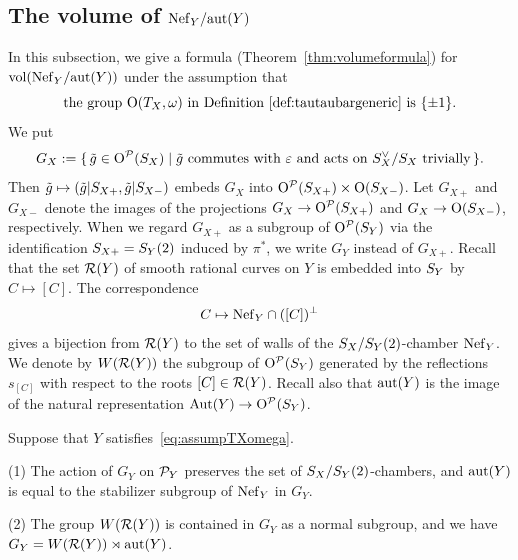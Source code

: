\documentclass{amsart}
\numberwithin{procedure}{section}
\begin{document}
\subsection{The volume of $\mathord{\rm Nef}_{Y}/\mathord{\rm{aut}}(Y)$}\label{subsec:vol}
%
In this subsection,
we give a  formula (Theorem~\ref{thm:volumeformula}) 
for $\mathord{\rm{vol}}(\mathord{\rm Nef}_{Y}/\mathord{\rm{aut}}(Y))$
under the assumption that 
%
\begin{equation}\label{eq:assumpTXomega}
\textrm{the group $\mathord{\mathrm{O}}(T_X, \omega)$  in Definition~\ref{def:tautaubargeneric} is $\{\pm 1\}$.}
\end{equation}
We put 
%
\begin{equation}\label{eq:GX}
G_X:=\{\,{\tilde{g} \in \mathord{\mathrm{O}}^{\mathord{\mathcal P}}(S_{X})}\mid {\textrm{$\tilde{g}$ commutes with $\varepsilon$ and acts on $S_{X}\sp{\vee}/S_{X}$ trivially}} \,\}.
\end{equation}
%
Then $\tilde{g}\mapsto (\tilde{g} | S_{X+}, \tilde{g} | S_{X-})$ embeds $G_X$ into  $\mathord{\mathrm{O}}^{\mathord{\mathcal P}}(S_{X+})\times \mathord{\mathrm{O}}(S_{X-})$.
Let $G_{X+}$ and $G_{X-}$ denote the images  of
the projections $G_X\to \mathord{\mathrm{O}}^{\mathord{\mathcal P}}(S_{X+})$ and $G_X\to \mathord{\mathrm{O}}(S_{X-})$,
respectively.
When we regard $G_{X+}$ as a subgroup of $\mathord{\mathrm{O}}^{\mathord{\mathcal P}}(S_{Y})$ via
the identification $S_{X+}=S_{Y}(2)$ induced by $\pi^*$, we write  $G_Y$ instead of $G_{X+}$.
%
%
Recall that the set $\mathord{\mathcal R}(Y)$ of smooth rational curves on $Y$
is embedded into $S_{Y}$ by $C\mapsto [C]$.
The correspondence
\[
C \mapsto \mathord{\rm Nef}_{Y}\cap ([C])\sp{\perp}
\]
gives a bijection from $\mathord{\mathcal R}(Y)$ to the set of walls of the $S_{X}/S_{Y}(2)$-chamber $\mathord{\rm Nef}_{Y}$.
We denote by $W(\mathord{\mathcal R}(Y))$ the subgroup of $\mathord{\mathrm{O}}^{\mathord{\mathcal P}}(S_{Y})$ 
generated by the reflections $s_{[C]}$ with respect to the roots $[C]\in \mathord{\mathcal R}(Y)$.
Recall also that  $\mathord{\rm{aut}}(Y)$ is the image of the natural representation $\operatorname{\mathrm{Aut}}\nolimits(Y)\to \mathord{\mathrm{O}}^{\mathord{\mathcal P}}(S_{Y})$.
%
\begin{proposition}\label{prop:GY}
Suppose that $Y$ satisfies~\eqref{eq:assumpTXomega}.
\par
{\rm (1)} 
The action of $G_Y$ on $\mathord{\mathcal P}_Y$ preserves the set of  $S_{X}/S_{Y}(2)$-chambers,
and $\mathord{\rm{aut}}(Y)$ 
is equal to the stabilizer subgroup of $\mathord{\rm Nef}_{Y}$  in $G_Y$.
\par
{\rm (2)} 
The group $W(\mathord{\mathcal R}(Y))$ is contained in $G_Y$ as a normal subgroup,
and we have $G_Y=W(\mathord{\mathcal R}(Y))\rtimes \mathord{\rm{aut}}(Y)$.
\end{proposition} 
\end{document}
